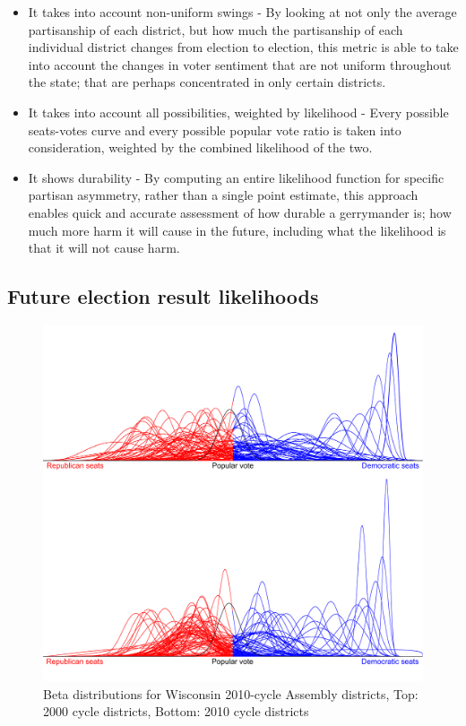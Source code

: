 \documentclass[preprint,12pt]{article}
\begin{document}
\begin{itemize}

\item It takes into account non-uniform swings - By looking at not only the average partisanship of each district, but how much the partisanship of each individual district changes from election to election, this metric is able to take into account the changes in voter sentiment that are not uniform throughout the state; that are perhaps concentrated in only certain districts.

\item It takes into account all possibilities, weighted by likelihood - Every possible seats-votes curve and every possible popular vote ratio is taken into consideration, weighted by the combined likelihood of the two.

\item It shows durability - By computing an entire likelihood function for specific partisan asymmetry, rather than a single point estimate, this approach enables quick and accurate assessment of how durable a gerrymander is; how much more harm it will cause in the future, including what the likelihood is that it will not cause harm.

\end{itemize}

\subsection{Future election result likelihoods}

\begin{figure}[htb!]
    \begin{center}
        \includegraphics[scale=0.25]{../Figures/WI_compared/Betas_cropped.png}
        \caption{Beta distributions for Wisconsin 2010-cycle Assembly districts, Top: 2000 cycle districts, Bottom: 2010 cycle districts}\label{fig:Betas}
    \end{center}
\end{figure}
 
\end{document}
